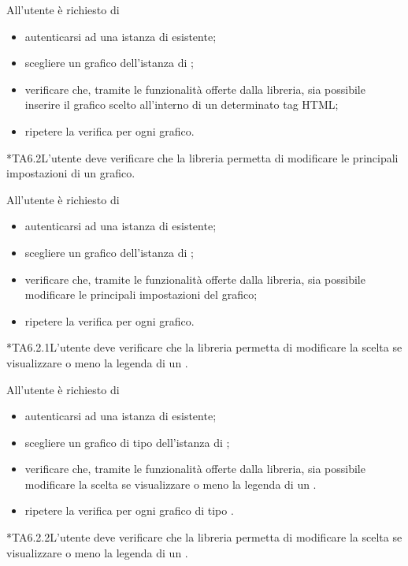 		All'utente  è richiesto di
		\begin{itemize}
			\item autenticarsi ad una istanza di \projectname{} esistente;
			\item scegliere un grafico dell'istanza di \projectname{};
			\item verificare che, tramite le funzionalità offerte dalla libreria, sia possibile inserire il grafico scelto all'interno di un determinato tag HTML;
			\item ripetere la verifica per ogni grafico.
		\end{itemize}

	*{TA6.2}L'utente  deve verificare che la libreria permetta di modificare le principali impostazioni di un grafico.
		
		All'utente  è richiesto di
		\begin{itemize}
			\item autenticarsi ad una istanza di \projectname{} esistente;
			\item scegliere un grafico dell'istanza di \projectname{};
			\item verificare che, tramite le funzionalità offerte dalla libreria, sia possibile modificare le principali impostazioni del grafico;
			\item ripetere la verifica per ogni grafico.
		\end{itemize}

	*{TA6.2.1}L'utente  deve verificare che la libreria permetta di modificare la scelta se visualizzare o meno la legenda di un .
		
		All'utente  è richiesto di
		\begin{itemize}
			\item autenticarsi ad una istanza di \projectname{} esistente;
			\item scegliere un grafico di tipo  dell'istanza di \projectname{};
			\item verificare che, tramite le funzionalità offerte dalla libreria, sia possibile modificare la scelta se visualizzare o meno la legenda di un .
			\item ripetere la verifica per ogni grafico di tipo .
		\end{itemize}

	*{TA6.2.2}L'utente  deve verificare che la libreria permetta di modificare la scelta se visualizzare o meno la legenda di un .
		
